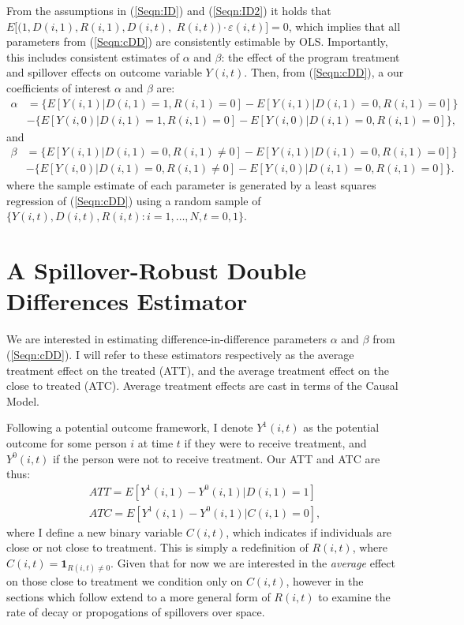 From the assumptions in (\ref{Seqn:ID}) and (\ref{Seqn:ID2}) it holds that 
$E[(1,D(i,1),R(i,1),D(i,t),$
$R(i,t))\cdot\varepsilon(i,t)]=0$, which 
implies that all parameters from (\ref{Seqn:cDD}) are consistently estimable 
by OLS.  Importantly, this includes consistent estimates of $\alpha$ and 
$\beta$: the effect of the program treatment and spillover effects on 
outcome variable $Y(i,t)$.  Then, from (\ref{Seqn:cDD}), a our coefficients 
of interest $\alpha$ and $\beta$ are:
\begin{equation}
\nonumber
\label{Seqn:DDa}
\begin{split}
\alpha&=\{E[Y(i,1)|D(i,1)=1,R(i,1)=0]-E[Y(i,1)|D(i,1)=0,R(i,1)=0]\} \\
      &-\{E[Y(i,0)|D(i,1)=1,R(i,1)=0]-E[Y(i,0)|D(i,1)=0,R(i,1)=0]\}, 
\end{split}
\end{equation}
and 
\begin{equation}
\nonumber
\label{Seqn:DDb}
\begin{split}
\beta&=\{E[Y(i,1)|D(i,1)=0,R(i,1)\neq 0]-E[Y(i,1)|D(i,1)=0,R(i,1)=0]\} \\
      &-\{E[Y(i,0)|D(i,1)=0,R(i,1)\neq 0]-E[Y(i,0)|D(i,1)=0,R(i,1)=0]\}. 
\end{split}
\end{equation}
where the sample estimate of each parameter is generated by a least squares
regression of (\ref{Seqn:cDD}) using a random sample of 
$\{Y(i,t), D(i,t), R(i,t): i=1, \ldots, N, t=0, 1\}$.

\section{A Spillover-Robust Double Differences Estimator}
\label{Sscn:estim}
We are interested in estimating difference-in-difference parameters $\alpha$ and 
$\beta$ from (\ref{Seqn:cDD}).  I will refer to these estimators respectively
as the average treatment effect on the treated (ATT), and the average treatment
effect on the close to treated (ATC).  Average treatment effects are cast in 
terms of the \citet{Rubin1974} Causal Model.

Following a potential outcome framework, I denote $Y^1(i,t)$ as the potential
outcome for some person $i$ at time $t$ if they were to receive treatment, and
$Y^0(i,t)$ if the person were not to receive treatment.  Our ATT and ATC are
thus:
\begin{eqnarray}
\label{Seqn:estimATT}
ATT=E[Y^1(i,1)-Y^0(i,1)|D(i,1)=1]\  \\
\label{Seqn:estimATC}
ATC=E[Y^1(i,1)-Y^0(i,1)|C(i,1)= 0],
\end{eqnarray}
where I define a new binary variable $C(i,t)$, which indicates if individuals 
are close or not close to treatment.  This is simply a redefinition of $R(i,t)$,
where $C(i,t)=\mathbf{1}_{R(i,t)\neq 0}$.  Given that for now we are interested
in the \emph{average} effect on those close to treatment we condition only on
$C(i,t)$, however in the sections which follow extend to a more general form of
$R(i,t)$ to examine the rate of decay or propogations of spillovers over space.

